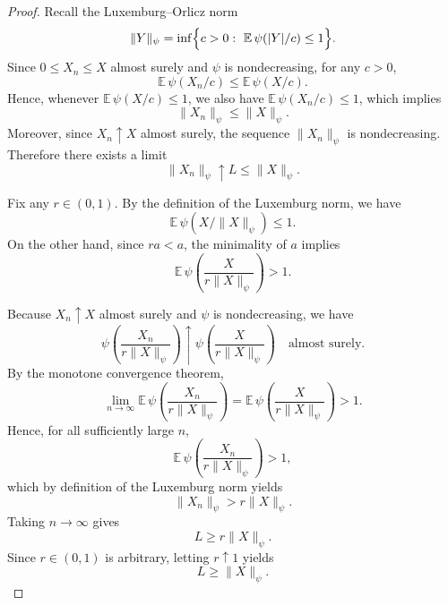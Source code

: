 \documentclass[12pt]{article}
\renewcommand{\(}{\left(}%
\renewcommand{\)}{\right)}%
\renewcommand{\[}{\left[}%
\renewcommand{\]}{\right]}%
\newtheorem{proof}{Proof.}}
\begin{document}
\begin{proof}
Recall the Luxemburg--Orlicz norm
\begin{equation*}
\|Y\|_\psi
=
\inf\Bigl\{c>0:\ \mathbb E\,\psi(|Y|/c)\le 1\Bigr\}.
\end{equation*}
Since $0\le X_n \le X$ almost surely and $\psi$ is nondecreasing, for any $c>0$,
\begin{equation*}
\mathbb E\,\psi(X_n/c)\le \mathbb E\,\psi(X/c).
\end{equation*}
Hence, whenever $\mathbb E\,\psi(X/c)\le 1$, we also have
$\mathbb E\,\psi(X_n/c)\le 1$, which implies
\begin{equation*}
\|X_n\|_\psi \le \|X\|_\psi .
\end{equation*}
Moreover, since $X_n \uparrow X$ almost surely, the sequence
$\|X_n\|_\psi$ is nondecreasing. Therefore there exists a limit
\begin{equation*}
\|X_n\|_\psi \uparrow L \le \|X\|_\psi .
\end{equation*}


Fix any $r\in(0,1)$. By the definition of the Luxemburg
norm, we have
\begin{equation*}
\mathbb E\,\psi(X/\|X\|_\psi)\le 1.
\end{equation*}
On the other hand, since $ra<a$, the minimality of $a$ implies
\begin{equation*}
\mathbb E\,\psi\!\left(\frac{X}{r\|X\|_\psi}\right)>1.
\end{equation*}

Because $X_n \uparrow X$ almost surely and $\psi$ is nondecreasing, we have
\begin{equation*}
\psi\!\left(\frac{X_n}{r\|X\|_\psi}\right)
\uparrow
\psi\!\left(\frac{X}{r\|X\|_\psi}\right)
\quad\text{almost surely}.
\end{equation*}
By the monotone convergence theorem,
\begin{equation*}
\lim_{n\to\infty}
\mathbb E\,\psi\!\left(\frac{X_n}{r\|X\|_\psi}\right)
=
\mathbb E\,\psi\!\left(\frac{X}{r\|X\|_\psi}\right)
>1.
\end{equation*}
Hence, for all sufficiently large $n$,
\begin{equation*}
\mathbb E\,\psi\!\left(\frac{X_n}{r\|X\|_\psi}\right)>1,
\end{equation*}
which by definition of the Luxemburg norm yields
\begin{equation*}
\|X_n\|_\psi > r\|X\|_\psi.
\end{equation*}
Taking $n\to\infty$ gives
\begin{equation*}
L \ge r\|X\|_\psi.
\end{equation*}
Since $r\in(0,1)$ is arbitrary, letting $r\uparrow 1$ yields
\begin{equation*}
L \ge  \|X\|_\psi .
\end{equation*}
\end{proof}
\end{document}
